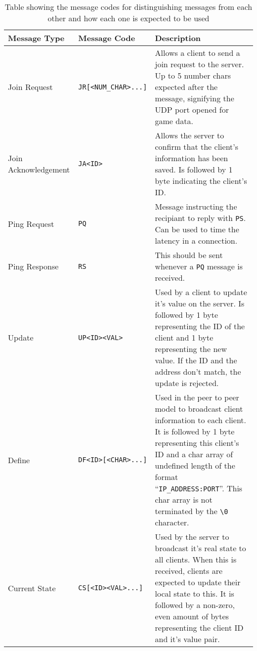 \begin{table}[p]
  \centering
  \begin{tabular}{ l l p{}}
    \toprule
    Message Type & Message Code & Description \\
    \midrule
    Join Request &
      \lstinline[]$JR[<NUM_CHAR>...]$ &
      Allows a client to send a join request to the server. Up to 5 number chars expected after the message, signifying the UDP port opened for game data. \\
    \addlinespace[10pt]
    Join Acknowledgement &
      \lstinline[]$JA<ID>$ &
      Allows the server to confirm that the client's information has been saved. Is followed by 1 byte indicating the client's ID. \\
    \addlinespace[10pt]
    Ping Request &
      \lstinline[]$PQ$ &
      Message instructing the recipiant to reply with \lstinline[]$PS$. Can be used to time the latency in a connection. \\
    \addlinespace[10pt]
    Ping Response &
      \lstinline[]$RS$ &
      This should be sent whenever a \lstinline[]$PQ$ message is received. \\
    \addlinespace[10pt]
    Update &
      \lstinline[]$UP<ID><VAL>$ &
      Used by a client to update it's value on the server. Is followed by 1 byte representing the ID of the client and 1 byte representing the new value. If the ID and the address don't match, the update is rejected. \\
    \addlinespace[10pt]
    Define &
      \lstinline[]$DF<ID>[<CHAR>...]$ &
      Used in the peer to peer model to broadcast client information to each client. It is followed by 1 byte representing this client's ID and a char array of undefined length of the format ``\lstinline[]$IP_ADDRESS:PORT$''. This char array is not terminated by the \lstinline[]$\0$ character. \\
    \addlinespace[10pt]
    Current State &
      \lstinline[]$CS[<ID><VAL>...]$ &
      Used by the server to broadcast it's real state to all clients. When this is received, clients are expected to update their local state to this. It is followed by a non-zero, even amount of bytes representing the client ID and it's value pair. \\

    \bottomrule
  \end{tabular}
  \caption{Table showing the message codes for distinguishing messages from each other and how each one is expected to be used}
  \label{table:message-codes}
\end{table}
